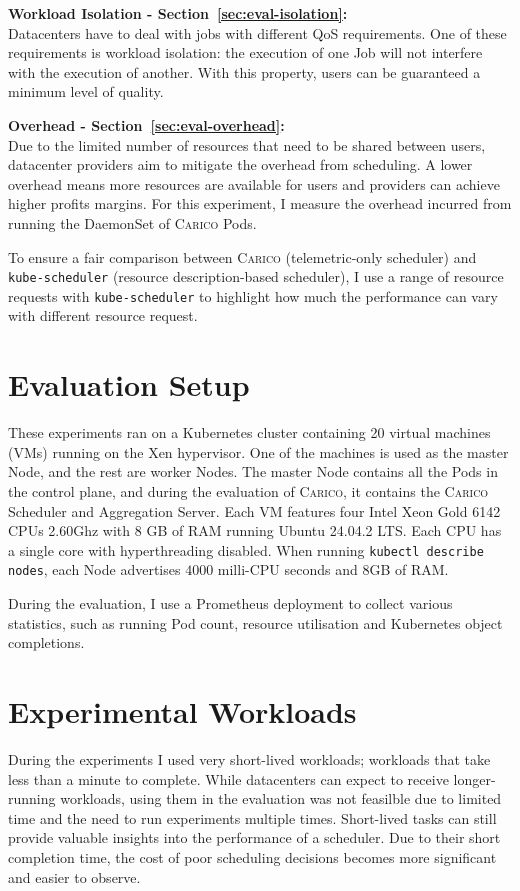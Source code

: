 \textbf{Workload Isolation - Section~\ref{sec:eval-isolation}:}\\
Datacenters have to deal with jobs with different QoS requirements. One of
these requirements is workload isolation: the execution of one Job will not
interfere with the execution of another. With this property, users can be
guaranteed a minimum level of quality.

\textbf{Overhead - Section~\ref{sec:eval-overhead}:}\\
Due to the limited number of resources that need to be shared between users,
datacenter providers aim to mitigate the overhead from scheduling. A lower
overhead means more resources are available for users and providers can achieve
higher profits margins. For this experiment, I measure the overhead incurred
from running the DaemonSet of \textsc{Carico} Pods.

To ensure a fair comparison between \textsc{Carico} (telemetric-only scheduler)
and \texttt{kube-scheduler} (resource description-based scheduler), I use a
range of resource requests with \texttt{kube-scheduler} to highlight how much
the performance can vary with different resource request.

\section{Evaluation Setup}
These experiments ran on a Kubernetes cluster containing 20 virtual machines
(VMs) running on the Xen hypervisor. One of the machines is used as the master
Node, and the rest are worker Nodes. The master Node contains all the Pods in
the control plane, and during the evaluation of \textsc{Carico}, it contains the \textsc{Carico}
Scheduler and Aggregation Server. Each VM features four Intel Xeon Gold 6142
CPUs \@ 2.60Ghz with 8 GB of RAM running Ubuntu 24.04.2 LTS. Each CPU has a
single core with hyperthreading disabled. When running \texttt{kubectl describe
nodes}, each Node advertises $4000$ milli-CPU seconds and 8GB of RAM.

During the evaluation, I use a Prometheus deployment \cite{} to collect various
statistics, such as running Pod count, resource utilisation and Kubernetes
object completions.

%

\section{Experimental Workloads}
During the experiments I used very short-lived workloads; workloads that take
less than a minute to complete. While datacenters can expect to receive
longer-running workloads, using them in the evaluation was not feasilble due to
limited time and the need to run experiments multiple times. Short-lived tasks
can still provide valuable insights into the performance of a scheduler. Due
to their short completion time, the cost of poor scheduling decisions becomes
more significant and easier to observe.


